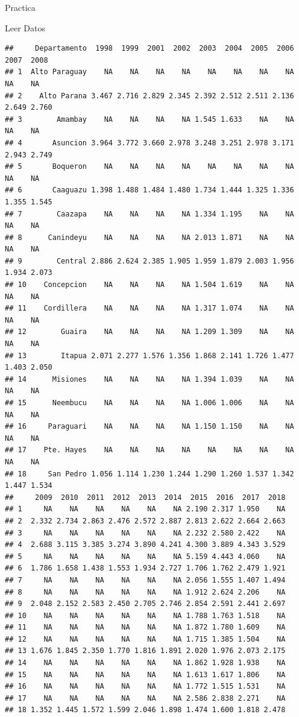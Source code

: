 \documentclass[
  ignorenonframetext,
]{beamer}
\begin{document}
\begin{frame}[fragile]{Practica}
\begin{block}{Leer Datos}
\begin{verbatim}
##     Departamento  1998  1999  2001  2002  2003  2004  2005  2006  2007  2008
## 1  Alto Paraguay    NA    NA    NA    NA    NA    NA    NA    NA    NA    NA
## 2    Alto Parana 3.467 2.716 2.829 2.345 2.392 2.512 2.511 2.136 2.649 2.760
## 3        Amambay    NA    NA    NA    NA 1.545 1.633    NA    NA    NA    NA
## 4       Asuncion 3.964 3.772 3.660 2.978 3.248 3.251 2.978 3.171 2.943 2.749
## 5       Boqueron    NA    NA    NA    NA    NA    NA    NA    NA    NA    NA
## 6       Caaguazu 1.398 1.488 1.484 1.480 1.734 1.444 1.325 1.336 1.355 1.545
## 7        Caazapa    NA    NA    NA    NA 1.334 1.195    NA    NA    NA    NA
## 8      Canindeyu    NA    NA    NA    NA 2.013 1.871    NA    NA    NA    NA
## 9        Central 2.886 2.624 2.385 1.905 1.959 1.879 2.003 1.956 1.934 2.073
## 10    Concepcion    NA    NA    NA    NA 1.504 1.619    NA    NA    NA    NA
## 11    Cordillera    NA    NA    NA    NA 1.317 1.074    NA    NA    NA    NA
## 12        Guaira    NA    NA    NA    NA 1.209 1.309    NA    NA    NA    NA
## 13        Itapua 2.071 2.277 1.576 1.356 1.868 2.141 1.726 1.477 1.403 2.050
## 14      Misiones    NA    NA    NA    NA 1.394 1.039    NA    NA    NA    NA
## 15      Neembucu    NA    NA    NA    NA 1.006 1.006    NA    NA    NA    NA
## 16     Paraguari    NA    NA    NA    NA 1.150 1.150    NA    NA    NA    NA
## 17    Pte. Hayes    NA    NA    NA    NA    NA    NA    NA    NA    NA    NA
## 18     San Pedro 1.056 1.114 1.230 1.244 1.290 1.260 1.537 1.342 1.447 1.534
##     2009  2010  2011  2012  2013  2014  2015  2016  2017  2018
## 1     NA    NA    NA    NA    NA    NA 2.190 2.317 1.950    NA
## 2  2.332 2.734 2.863 2.476 2.572 2.887 2.813 2.622 2.664 2.663
## 3     NA    NA    NA    NA    NA    NA 2.232 2.580 2.422    NA
## 4  2.688 3.115 3.385 3.274 3.890 4.241 4.300 3.889 4.343 3.529
## 5     NA    NA    NA    NA    NA    NA 5.159 4.443 4.060    NA
## 6  1.786 1.658 1.438 1.553 1.934 2.727 1.706 1.762 2.479 1.921
## 7     NA    NA    NA    NA    NA    NA 2.056 1.555 1.407 1.494
## 8     NA    NA    NA    NA    NA    NA 1.912 2.624 2.206    NA
## 9  2.048 2.152 2.583 2.450 2.705 2.746 2.854 2.591 2.441 2.697
## 10    NA    NA    NA    NA    NA    NA 1.788 1.763 1.518    NA
## 11    NA    NA    NA    NA    NA    NA 1.872 1.780 1.609    NA
## 12    NA    NA    NA    NA    NA    NA 1.715 1.385 1.504    NA
## 13 1.676 1.845 2.350 1.770 1.816 1.891 2.020 1.976 2.073 2.175
## 14    NA    NA    NA    NA    NA    NA 1.862 1.928 1.938    NA
## 15    NA    NA    NA    NA    NA    NA 1.613 1.617 1.806    NA
## 16    NA    NA    NA    NA    NA    NA 1.772 1.515 1.531    NA
## 17    NA    NA    NA    NA    NA    NA 2.586 2.838 2.271    NA
## 18 1.352 1.445 1.572 1.599 2.046 1.898 1.474 1.600 1.818 2.478
\end{verbatim}
\end{block}


\end{frame}
\end{document}

